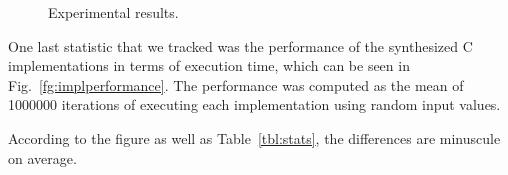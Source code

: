 \begin{table}[!t]
\end{table}

\begin{figure}[!t]
\centering
\vspace{-5pt}
\hspace{-2em}
\quad
{}
\vspace{-5pt}
\caption{Experimental results.}
\vspace{-5pt}
\label{fg:results}
\end{figure}


One last statistic that we tracked was the performance of the synthesized C
implementations in terms of execution time, which can be seen in Fig.~\ref{fg:implperformance}. The performance was computed as the mean of 1000000 iterations of executing each implementation using random input values.
 \iffalse
  For this purpose, we translated the
 generated witnesses from \jsyn and \jsynvg solutions using
 \smtlibtoc under the same set of options.
 \fi
 According to the figure as well as Table~\ref{tbl:stats}, the differences are minuscule on average.
\iffalse
while \jsyn implementations are faster, the difference is minuscule on average.
This small difference may occur due to the fact that \jsyn creates separate skolem functions for the initial evaluation
(when \%init is true)

and subsequent evaluations, whereas currently \jsynvg uses a single function for both cases, and as such requires the evaluation of richer expressions prior to choosing a proper reaction.
\fi




